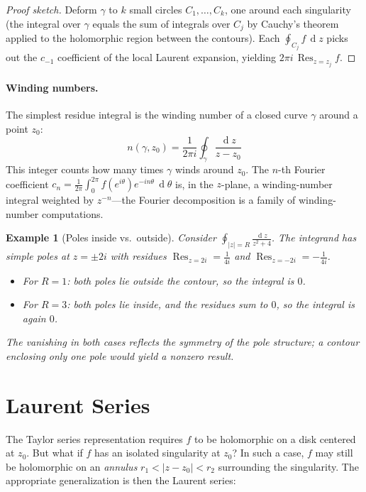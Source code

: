 \documentclass[12pt,a4paper]{report}
\DeclareMathOperator{\deriv}{d}
\theoremstyle{thms}
\theoremstyle{defns}
\newtheorem{example}{Example}[section]
\begin{document}
\begin{proof}[Proof sketch]
    Deform $\gamma$ to $k$ small circles $C_1, \ldots, C_k$, one around each singularity (the integral over $\gamma$ equals the sum of integrals over $C_j$ by Cauchy's theorem applied to the holomorphic region between the contours). Each $\oint_{C_j} f\,\deriv{z}$ picks out the $c_{-1}$ coefficient of the local Laurent expansion, yielding $2\pi i\,\operatorname{Res}_{z = z_j} f$.
\end{proof}

\paragraph{Winding numbers.} The simplest residue integral is the winding number of a closed curve $\gamma$ around a point $z_0$:
\begin{equation}
    n(\gamma, z_0) = \dfrac{1}{2\pi i}\oint_\gamma \dfrac{\deriv{z}}{z - z_0}
\end{equation}
This integer counts how many times $\gamma$ winds around $z_0$. The $n$-th Fourier coefficient $c_n = \frac{1}{2\pi}\int_0^{2\pi} f(e^{i\theta})e^{-in\theta}\,\deriv{\theta}$ is, in the $z$-plane, a winding-number integral weighted by $z^{-n}$—the Fourier decomposition is a family of winding-number computations.

\begin{example}[Poles inside vs.\ outside]
    Consider $\oint_{|z|=R} \frac{\deriv{z}}{z^2 + 4}$. The integrand has simple poles at $z = \pm 2i$ with residues $\operatorname{Res}_{z=2i} = \frac{1}{4i}$ and $\operatorname{Res}_{z=-2i} = -\frac{1}{4i}$.
    \begin{itemize}
        \item For $R = 1$: both poles lie outside the contour, so the integral is $0$.
        \item For $R = 3$: both poles lie inside, and the residues sum to $0$, so the integral is again $0$.
    \end{itemize}
    The vanishing in both cases reflects the symmetry of the pole structure; a contour enclosing only one pole would yield a nonzero result.
\end{example}

\section{Laurent Series}
\label{sec:laurent}
The Taylor series representation requires $f$ to be holomorphic on a disk centered at $z_0$. But what if $f$ has an isolated singularity at $z_0$? In such a case, $f$ may still be holomorphic on an \textit{annulus} $r_1 < |z - z_0| < r_2$ surrounding the singularity. The appropriate generalization is then the Laurent series:
\end{document}
